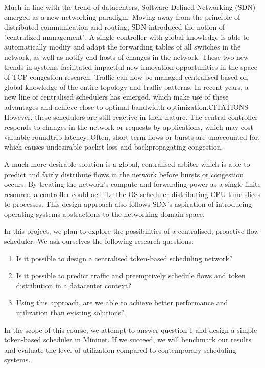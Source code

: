 Much in line with the trend of datacenters, Software-Defined Networking (SDN) emerged as a new networking paradigm. Moving away from the principle of distributed communication and routing, SDN introduced the notion of "centralized management". A single controller with global knowledge is able to automatically modify and adapt the forwarding tables of all switches in the network, as well as notify end hosts of changes in the network.
These two new trends in systems facilitated impactful new innovation opportunities in the space of TCP congestion research. Traffic can now be managed centralised based on global knowledge of the entire topology and traffic patterns.
 In recent years, a new line of centralised schedulers has emerged, which make use of these advantages and achieve close to optimal bandwidth optimization.{CITATIONS}
However, these schedulers are still reactive  in their nature. The central controller responds to changes in the network or requests by applications, which may cost valuable roundtrip latency. Often, short-term flows or bursts are unaccounted for, which causes undesirable packet loss and backpropagating congestion. 

A much more desirable solution is a global, centralised arbiter which is able to predict and fairly distribute flows in the network before bursts or congestion occurs. By treating the network’s compute and forwarding power as a single finite resource, a controller could act like the OS scheduler distributing CPU time slices to processes. This design approach also follows SDN’s aspiration of introducing operating systems abstractions to the networking domain space.


In this project, we plan to explore the possibilities of a centralised, proactive flow scheduler. We ask ourselves the following research questions:
\begin{enumerate}
\item Is it possible to design a centralised token-based scheduling network?
\item Is it possible to predict traffic and preemptively schedule flows and token distribution in a datacenter context?
\item Using this approach, are we able to achieve better performance and utilization than existing solutions?
\end{enumerate}

In the scope of this course, we attempt to answer question 1 and design a simple token-based scheduler in Mininet. If we succeed, we will benchmark our results and evaluate the level of utilization compared to contemporary scheduling systems.


